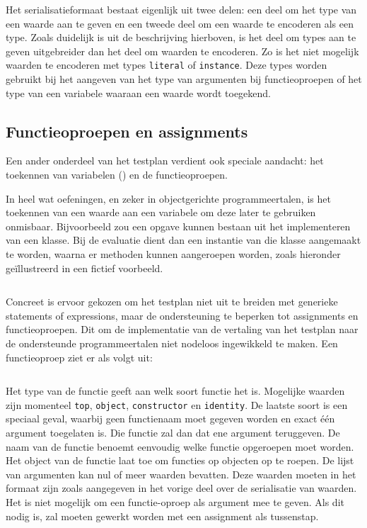 Het serialisatieformaat bestaat eigenlijk uit twee delen: een deel om het type van een waarde aan te geven en een tweede deel om een waarde te encoderen als een type.
Zoals duidelijk is uit de beschrijving hierboven, is het deel om types aan te geven uitgebreider dan het deel om waarden te encoderen.
Zo is het niet mogelijk waarden te encoderen met types \texttt{literal} of \texttt{instance}.
Deze types worden gebruikt bij het aangeven van het type van argumenten bij functieoproepen of het type van een variabele waaraan een waarde wordt toegekend.

\subsection{Functieoproepen en assignments}\label{subsec:functieoproepen}

Een ander onderdeel van het testplan verdient ook speciale aandacht: het toekennen van variabelen () en de functieoproepen.

In heel wat oefeningen, en zeker in objectgerichte programmeertalen, is het toekennen van een waarde aan een variabele om deze later te gebruiken onmisbaar.
Bijvoorbeeld zou een opgave kunnen bestaan uit het implementeren van een klasse.
Bij de evaluatie dient dan een instantie van die klasse aangemaakt te worden, waarna er methoden kunnen aangeroepen worden, zoals hieronder geïllustreerd in een fictief voorbeeld.

\inputminted{java}{code/assignment.jshell}

Concreet is ervoor gekozen om het testplan niet uit te breiden met generieke statements of expressions, maar de ondersteuning te beperken tot assignments en functieoproepen.
Dit om de implementatie van de vertaling van het testplan naar de ondersteunde programmeertalen niet nodeloos ingewikkeld te maken.
Een functieoproep ziet er als volgt uit:

\inputminted{json}{code/function.json}

Het type van de functie geeft aan welk soort functie het is.
Mogelijke waarden zijn momenteel \texttt{top}, \texttt{object}, \texttt{constructor} en \texttt{identity}.
De laatste soort is een speciaal geval, waarbij geen functienaam moet gegeven worden en exact één argument toegelaten is.
Die functie zal dan dat ene argument teruggeven.
De naam van de functie benoemt eenvoudig welke functie opgeroepen moet worden.
Het object van de functie laat toe om functies op objecten op te roepen.
De lijst van argumenten kan nul of meer waarden bevatten.
Deze waarden moeten in het formaat zijn zoals aangegeven in het vorige deel over de serialisatie van waarden.
Het is niet mogelijk om een functie-oproep als argument mee te geven.
Als dit nodig is, zal moeten gewerkt worden met een assignment als tussenstap.

